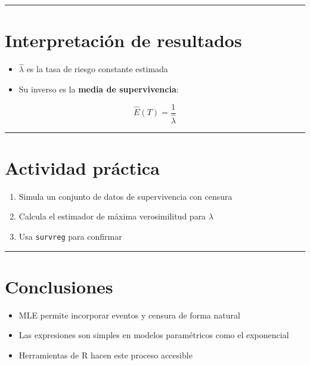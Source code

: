 \documentclass[
]{article}
\providecommand{\tightlist}{%
  \setlength{\itemsep}{0pt}\setlength{\parskip}{0pt}}
\begin{document}
\begin{center}\rule{0.5\linewidth}{0.5pt}\end{center}

\section{Interpretación de
resultados}\label{interpretaciuxf3n-de-resultados}

\begin{itemize}
\tightlist
\item
  \(\hat{\lambda}\) es la tasa de riesgo constante estimada
\item
  Su inverso es la \textbf{media de supervivencia}:
\end{itemize}

\[
\hat{E}(T) = \frac{1}{\hat{\lambda}}
\]

\begin{center}\rule{0.5\linewidth}{0.5pt}\end{center}

\section{Actividad práctica}\label{actividad-pruxe1ctica}

\begin{enumerate}
\def\labelenumi{\arabic{enumi}.}
\tightlist
\item
  Simula un conjunto de datos de supervivencia con censura
\item
  Calcula el estimador de máxima verosimilitud para \(\lambda\)
\item
  Usa \texttt{survreg} para confirmar
\end{enumerate}

\begin{center}\rule{0.5\linewidth}{0.5pt}\end{center}

\section{Conclusiones}\label{conclusiones}

\begin{itemize}
\tightlist
\item
  MLE permite incorporar eventos y censura de forma natural
\item
  Las expresiones son simples en modelos paramétricos como el
  exponencial
\item
  Herramientas de R hacen este proceso accesible
\end{itemize}
\end{document}
